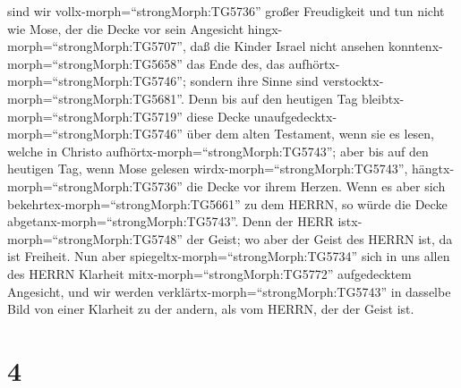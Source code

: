 sind wir vollx-morph=``strongMorph:TG5736'' großer Freudigkeit
 und tun nicht wie Mose, der die Decke vor sein Angesicht
hingx-morph=``strongMorph:TG5707'', daß die Kinder Israel nicht ansehen
konntenx-morph=``strongMorph:TG5658'' das Ende des, das
aufhörtx-morph=``strongMorph:TG5746'';  sondern ihre Sinne
sind verstocktx-morph=``strongMorph:TG5681''. Denn bis auf den heutigen
Tag bleibtx-morph=``strongMorph:TG5719'' diese Decke
unaufgedecktx-morph=``strongMorph:TG5746'' über dem alten Testament,
wenn sie es lesen, welche in Christo
aufhörtx-morph=``strongMorph:TG5743'';  aber bis auf den
heutigen Tag, wenn Mose gelesen wirdx-morph=``strongMorph:TG5743'',
hängtx-morph=``strongMorph:TG5736'' die Decke vor ihrem Herzen.
 Wenn es aber sich bekehrtex-morph=``strongMorph:TG5661''
zu dem HERRN, so würde die Decke abgetanx-morph=``strongMorph:TG5743''.
 Denn der HERR istx-morph=``strongMorph:TG5748'' der Geist;
wo aber der Geist des HERRN ist, da ist Freiheit.  Nun aber
spiegeltx-morph=``strongMorph:TG5734'' sich in uns allen des HERRN
Klarheit mitx-morph=``strongMorph:TG5772'' aufgedecktem Angesicht, und
wir werden verklärtx-morph=``strongMorph:TG5743'' in dasselbe Bild von
einer Klarheit zu der andern, als vom HERRN, der der Geist ist.

\hypertarget{section-3}{%
\section{4}\label{section-3}}

